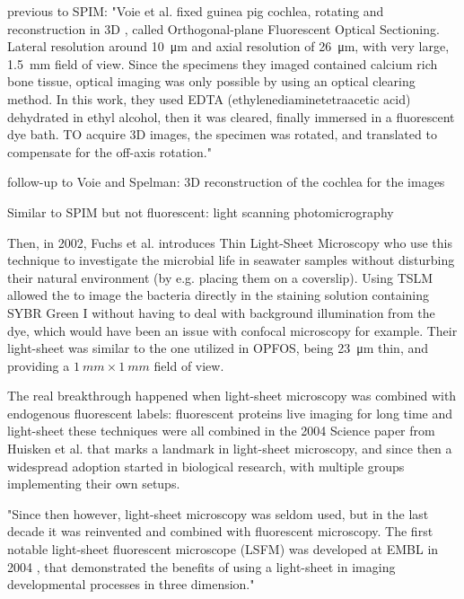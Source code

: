   previous to SPIM:
  "Voie et al. fixed guinea pig cochlea, rotating and reconstruction in 3D \cite{voie_orthogonal-plane_1993}, called Orthogonal-plane Fluorescent Optical Sectioning. Lateral resolution around \SI{10}{\micro m} and axial resolution of \SI{26}{\micro m}, with very large, \SI{1.5}{mm} field of view. Since the specimens they imaged contained calcium rich bone tissue, optical imaging was only possible by using an optical clearing method. In this work, they used EDTA (ethylenediaminetetraacetic acid) dehydrated in ethyl alcohol, then it was cleared, finally immersed in a fluorescent dye bath. TO acquire 3D images, the specimen was rotated, and translated to compensate for the off-axis rotation."

  follow-up to Voie and Spelman: \cite{voie_three-dimensional_1995} 3D reconstruction of the cochlea for the images

  Similar to SPIM but not fluorescent: light scanning photomicrography \cite{huber_3d_2001}

  Then, in 2002, Fuchs et al. introduces Thin  Light-Sheet Microscopy \cite{fuchs_thin_2002} who use this technique to investigate the microbial life in seawater samples without disturbing their natural environment (by e.g. placing them on a coverslip). Using TSLM allowed the to image the bacteria directly in the staining solution containing SYBR Green I without having to deal with background illumination from the dye, which would have been an issue with confocal microscopy for example. Their light-sheet was similar to the one utilized in OPFOS, being \SI{23}{\micro m} thin, and providing a $\SI{1}{mm} \times \SI{1}{mm}$ field of view.

  The real breakthrough happened when light-sheet microscopy was combined with 
  endogenous fluorescent labels: fluorescent proteins
  live imaging for long time
  and light-sheet
  these techniques were all combined in the 2004 Science paper from Huisken et al. that marks a landmark in light-sheet microscopy, and since then a widespread adoption started  in biological research, with multiple groups implementing their own setups.

  "Since then however, light-sheet microscopy was seldom used, but in the last decade it was reinvented and combined with fluorescent microscopy. The first notable light-sheet fluorescent microscope (LSFM) was developed at EMBL in 2004 \cite{huisken_optical_2004}, that demonstrated the benefits of using a light-sheet in imaging developmental processes in three dimension."

